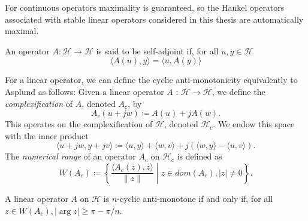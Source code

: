 For continuous operators maximality is guaranteed, so the Hankel operators associated with stable linear operators considered in this thesis are automatically maximal.
\begin{definition}
    An operator $A : \mathcal{H} \rightarrow \mathcal{H}$ is said to be self-adjoint if, for all $u,y \in \mathcal{H}$
    \begin{equation}
        \langle A(u),y \rangle = \langle u, A(y) \rangle
    \end{equation}
\end{definition}
For a linear operator, we can define the cyclic anti-monotonicity equivalently to Asplund as follows: 
Given a linear operator $A$ : $\mathcal{H}\rightarrow\mathcal{H}$, we define the \textit{complexification} of $A$, denoted $A_c$, by
\begin{equation*}
    A_c(u+jw) \coloneq A(u) +jA(w).
\end{equation*}
This operates on the complexification of $\mathcal{H}$, denoted $\mathcal{H}_c$. We endow this space with the inner product
\begin{equation*}
    \langle u+jw, y+jv \rangle \coloneq \langle u, y \rangle  + \langle w, v \rangle + j(\langle w,y \rangle - \langle u,v \rangle).
\end{equation*}
The \textit{numerical range} of an operator $A_c$ on $\mathcal{H}_c$ is defined as
\begin{equation*}
    W(A_c) \coloneq \left \{ \frac{\langle A_c(z), z\rangle }{\| z \| } \middle | z \in dom(A_c), \left| z \right| \neq 0 \right \}.
\end{equation*}
\begin{theorem}
    A linear operator $A$ on $\mathcal{H}$ is $n$-cyclic anti-monotone if and only if, for all $z \in W(A_c), \lvert \arg z \rvert \geq \pi - \pi/n$.
\end{theorem}
